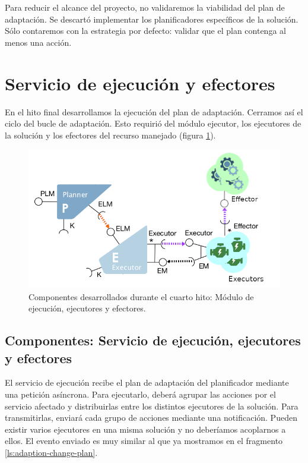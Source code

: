 Para reducir el alcance del proyecto, no validaremos la viabilidad del plan de adaptación. Se descartó implementar los planificadores específicos de la solución.  Sólo contaremos con la estrategia por defecto: validar que el plan contenga al menos una acción.

\section{Servicio de ejecución y efectores}


En el hito final desarrollamos la ejecución del plan de adaptación. Cerramos así el ciclo del bucle de adaptación. Esto requirió del módulo ejecutor, los ejecutores de la solución y los efectores del recurso manejado (figura \ref{fig:hito-4-ejecutor}).

\begin{figure}[h!]
  \centering
  \includegraphics[scale=0.55]{cap_implementacion/images/hito-4-ejecutor}
  \caption{Componentes desarrollados durante el cuarto hito: Módulo de ejecución, ejecutores y efectores.}
  \label{fig:hito-4-ejecutor}
\end{figure}

\subsection{Componentes: Servicio de ejecución, ejecutores y efectores}

El servicio de ejecución recibe el plan de adaptación del planificador mediante una petición asíncrona. Para ejecutarlo, deberá agrupar las acciones por el servicio afectado y distribuirlas entre los distintos ejecutores de la solución. Para transmitirlas, enviará cada grupo de acciones mediante una notificación. Pueden existir varios ejecutores en una misma solución y no deberíamos acoplarnos a ellos. El evento enviado es muy similar al que ya mostramos en el fragmento \ref{ls:adaption-change-plan}.

